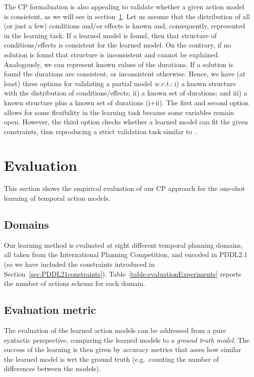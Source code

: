 \documentclass[runningheads]{llncs}
\begin{document}
The CP formaluation is also appealing to validate whether a given action model is consistent, as we will see in section~\ref{sec:evaluation}. Let us assume that the distribution of all (or just a few) conditions and/or effects is known and, consequently, represented in the learning task. If a learned model is found, then that structure of conditions/effects is consistent for the learned model. On the contrary, if no solution is found that structure is inconsistent and cannot be explained. Analogously, we can represent known values of the durations. If a solution is found the durations are consistent, or inconsistent otherwise.
Hence, we have (at least) three options for validating a partial model \emph{w.r.t.}: i) a known structure with the distribution of conditions/effects; ii) a known set of durations; and iii) a known structure plus a known set of durations (i+ii). The first and second option allows for some flexibility in the learning task because some variables remain open. However, the third option checks whether a learned model can fit the given constraints, thus reproducing a strict validation task similar to~\cite{howey2004val}.



\section{Evaluation}
\label{sec:evaluation}
This section shows the empirical evaluation of our CP approach for the one-shot learning of temporal action models.

\subsection{Domains}
Our learning method is evaluated at eight different temporal planning domains, all taken from the International Planning Competition, and encoded in PDDL2.1 (so we have included the constraints introduced in Section~\ref{sec:PDDL21constraints}). Table~\ref{table:evaluationExperiments} reports the number of actions schema for each domain.

\subsection{Evaluation metric}
The evaluation of the learned action models can be addressed from a pure syntactic perspective, comparing the learned models to a {\em ground truth model}. The success of the learning is then given by accuracy metrics that asses how similar the learned model is wrt the ground truth (e.g.~counting the number of differences between the models).
\end{document}
